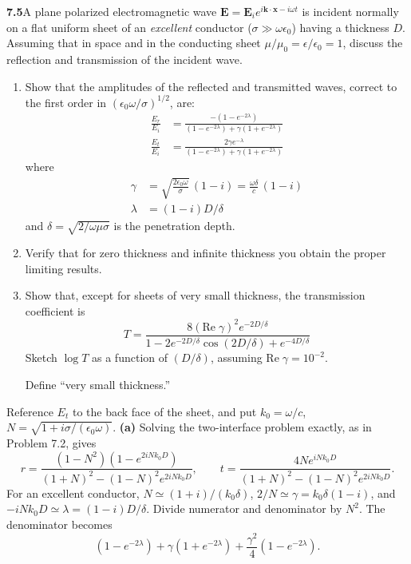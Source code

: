 \par\bigskip
\noindent\textbf{7.5}\quad A plane polarized electromagnetic wave $\mathbf{E}=\mathbf{E}_{i}e^{i\mathbf{k}\cdot\mathbf{x}-i\omega t}$ is incident normally on a flat uniform sheet of an \emph{excellent} conductor ($\sigma\gg\omega\epsilon_{0}$) having a thickness $D$. Assuming that in space and in the conducting sheet $\mu/\mu_{0}=\epsilon/\epsilon_{0}=1$, discuss the reflection and transmission of the incident wave.
\begin{enumerate}
\item[(a)] Show that the amplitudes of the reflected and transmitted waves, correct to the first order in $(\epsilon_{0}\omega/\sigma)^{1/2}$, are:
\begin{align*}
\frac{E_{r}}{E_{i}}&=\frac{-(1-e^{-2\lambda})}{(1-e^{-2\lambda})+\gamma(1+e^{-2\lambda})}\\[4pt]
\frac{E_{t}}{E_{i}}&=\frac{2\gamma e^{-\lambda}}{(1-e^{-2\lambda})+\gamma(1+e^{-2\lambda})}
\end{align*}
where
\begin{align*}
\gamma&=\sqrt{\frac{2\epsilon_{0}\omega}{\sigma}}\,(1-i)=\frac{\omega\delta}{c}\,(1-i)\\
\lambda&=(1-i)D/\delta
\end{align*}
and $\delta=\sqrt{2/\omega\mu\sigma}$ is the penetration depth.
\item[(b)] Verify that for zero thickness and infinite thickness you obtain the proper limiting results.
\item[(c)] Show that, except for sheets of very small thickness, the transmission coefficient is
\[
T=\frac{8(\mathrm{Re}\;\gamma)^{2}e^{-2D/\delta}}{1-2e^{-2D/\delta}\cos(2D/\delta)+e^{-4D/\delta}}
\]
Sketch $\log T$ as a function of $(D/\delta)$, assuming $\mathrm{Re}\;\gamma=10^{-2}$.

Define ``very small thickness.''
\end{enumerate}
\solution
Reference $E_t$ to the back face of the sheet, and put
$k_0=\omega/c$, $N=\sqrt{1+i\sigma/(\epsilon_0\omega)}$.
\textbf{(a)} Solving the two-interface problem exactly, as in
Problem 7.2, gives
\[
r=\frac{(1-N^2)(1-e^{2iNk_0D})}
 {(1+N)^2-(1-N)^2e^{2iNk_0D}},\qquad
t=\frac{4Ne^{iNk_0D}}
 {(1+N)^2-(1-N)^2e^{2iNk_0D}}.
\]
For an excellent conductor,
$N\simeq(1+i)/(k_0\delta)$,
$2/N\simeq\gamma=k_0\delta(1-i)$, and
$-iNk_0D\simeq\lambda=(1-i)D/\delta$.
Divide numerator and denominator by $N^2$. The denominator becomes
\[
(1-e^{-2\lambda})+\gamma(1+e^{-2\lambda})
                +\frac{\gamma^2}{4}(1-e^{-2\lambda}).
\]
